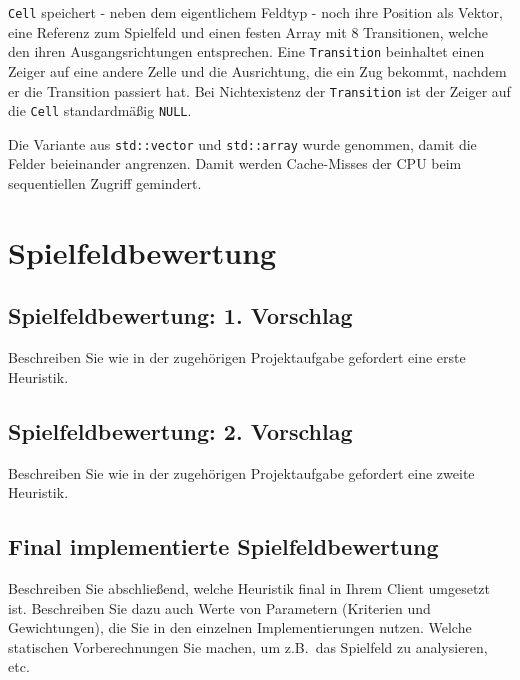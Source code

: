 \documentclass[12pt,a4paper]{article}
\begin{document}
\texttt{Cell} speichert - neben dem eigentlichem Feldtyp - noch ihre Position als Vektor, eine Referenz zum Spielfeld und einen festen Array mit 8 Transitionen, welche den ihren Ausgangsrichtungen entsprechen.
Eine \texttt{Transition} beinhaltet einen Zeiger auf eine andere Zelle und die Ausrichtung, die ein Zug bekommt, nachdem er die Transition passiert hat.
Bei Nichtexistenz der \texttt{Transition} ist der Zeiger auf die \texttt{Cell} standardmäßig \texttt{NULL}.

Die Variante aus \texttt{std::vector} und \texttt{std::array} wurde genommen, damit die Felder beieinander angrenzen. Damit werden Cache-Misses der CPU beim sequentiellen Zugriff gemindert.




\newpage
\section{Spielfeldbewertung}
\subsection{Spielfeldbewertung: 1. Vorschlag}
Beschreiben Sie wie in der zugehörigen Projektaufgabe gefordert eine erste Heuristik.

\subsection{Spielfeldbewertung: 2. Vorschlag}
Beschreiben Sie wie in der zugehörigen Projektaufgabe gefordert eine zweite Heuristik.

\subsection{Final implementierte Spielfeldbewertung}
Beschreiben Sie abschließend, welche Heuristik final in Ihrem Client umgesetzt ist. Beschreiben Sie dazu auch Werte von Parametern (Kriterien und Gewichtungen), die Sie in den einzelnen Implementierungen nutzen. Welche statischen Vorberechnungen Sie machen, um z.B.\ das Spielfeld zu analysieren, etc.
\end{document}
